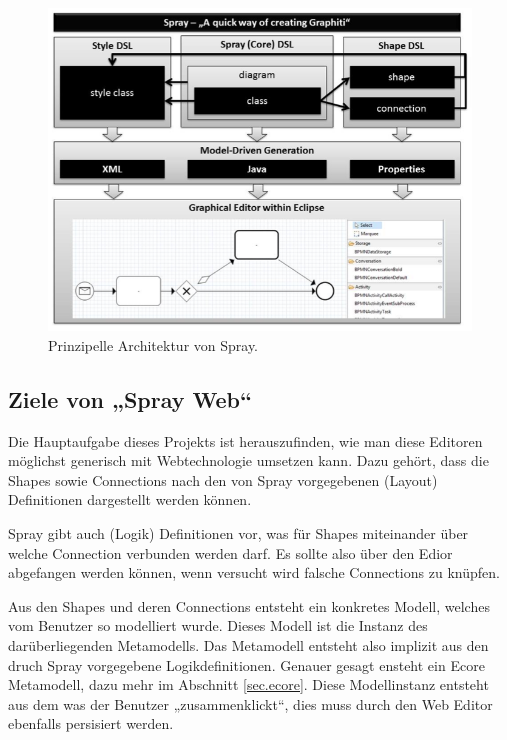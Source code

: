 \begin{figure}[h!]
  \centering
  \includegraphics[width=1.0\textwidth]{Figures/SprayArchitektur.png}
  \caption{Prinzipelle Architektur von Spray. \citep[aus][S.~3]{sprayPaper}}\label{fig.sprayArchi}
\end{figure}


\subsection{Ziele von „Spray Web“}

Die Hauptaufgabe dieses Projekts ist herauszufinden, wie man diese
Editoren möglichst generisch mit Webtechnologie umsetzen kann.
Dazu gehört, dass die Shapes sowie Connections nach den von Spray
vorgegebenen (Layout) Definitionen dargestellt werden können.

Spray gibt auch (Logik) Definitionen vor,
was für Shapes miteinander über welche Connection verbunden werden darf.
Es sollte also über den Edior abgefangen werden können, wenn versucht wird
falsche Connections zu knüpfen.

Aus den Shapes und deren Connections entsteht ein konkretes Modell,
welches vom Benutzer so modelliert wurde. Dieses Modell ist die Instanz
des darüberliegenden Metamodells.
Das Metamodell entsteht also implizit aus den druch Spray vorgegebene
Logikdefinitionen. Genauer gesagt ensteht ein Ecore Metamodell,
dazu mehr im Abschnitt \ref{sec.ecore}.
Diese Modellinstanz entsteht aus dem was der Benutzer „zusammenklickt“,
dies muss durch den Web Editor ebenfalls persisiert werden.

